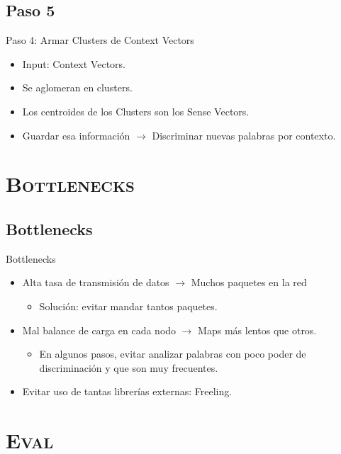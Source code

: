 \documentclass[xcolor=x11names,compress]{beamer}
\renewcommand{\(}{\begin{columns}}
\renewcommand{\)}{\end{columns}}
\newcommand{\<}[1]{\begin{column}{#1}}
\renewcommand{\>}{\end{column}}
\begin{document}
\subsection{Paso 5}
\begin{frame}{Paso 4: Armar Clusters de Context Vectors}
\begin{itemize}
\item Input: Context Vectors.
\item Se aglomeran en clusters.
\item Los centroides de los Clusters son los Sense Vectors.
\item Guardar esa información $\rightarrow$ Discriminar nuevas palabras por contexto.
\end{itemize}
\end{frame}


\section{\scshape Bottlenecks}
\subsection{Bottlenecks}
\begin{frame}{Bottlenecks}
\begin{itemize}
\item Alta tasa de transmisión de datos $\rightarrow$ Muchos paquetes en la red
\begin{itemize}
\item Solución: evitar mandar tantos paquetes.
\end{itemize}
\item Mal balance de carga en cada nodo $\rightarrow$ Maps más lentos que otros.
\begin{itemize}
\item En algunos pasos, evitar analizar palabras con poco poder de discriminación y que son muy frecuentes.
\end{itemize}
\item Evitar uso de tantas librerías externas: Freeling.
\end{itemize}
\end{frame}

\section{\scshape Eval}
\end{document}
